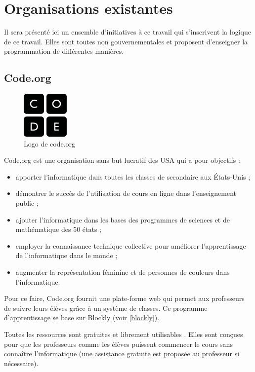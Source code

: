 \section{Organisations existantes}
Il sera présenté ici un ensemble d'initiatives à ce travail qui s'inscrivent la logique de ce travail. Elles sont toutes non gouvernementales et proposent d'enseigner la programmation de différentes manières.
\subsection{Code.org}
\begin{figure}[!ht]
  \begin{center}
    \includegraphics[scale=0.5]{content/5-related_work/images/code}
    \caption{Logo de code.org}
    \label{fig:code.org}
  \end{center}
\end{figure}
Code.org \cite{code-org-about} est une organisation sans but lucratif des USA qui a pour objectifs :
\begin{itemize}
  \item apporter l'informatique dans toutes les classes de \gls{secondaire} aux États-Unis ;
  \item démontrer le succès de l'utilisation de cours en ligne dans l'enseignement public ;
  \item ajouter l'informatique dans les bases des programmes de sciences et de mathématique des 50 états ;
  \item employer la connaissance technique collective pour améliorer l'apprentissage de l'informatique dans le monde ;
  \item augmenter la représentation féminine et de personnes de couleurs dans l'informatique.
\end{itemize}

Pour ce faire, Code.org fournit une plate-forme \cite{code-org-20hr} web qui permet aux professeurs de suivre leurs élèves grâce à un système de classes. Ce programme d'apprentissage se base sur Blockly (voir \ref{blockly}).

Toutes les ressources sont gratuites et librement utilisables \cite{code-org-faq}. Elles sont conçues pour que les professeurs comme les élèves puissent commencer le cours sans connaître l'informatique (une assistance gratuite est proposée au professeur si nécessaire).

